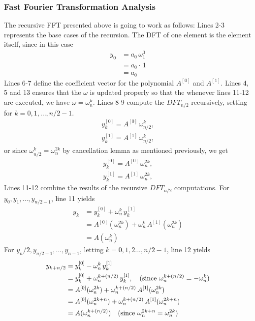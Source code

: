 \documentclass[preprint,12pt]{elsarticle}
\begin{document}
\subsubsection{Fast Fourier Transformation Analysis}
The recursive FFT presented above is going to work as follows: Lines 2-3 represents the base cases of the recursion. The DFT of one element is the element itself, since in this case
\begin{align*}
    y_0 &= a_0\,\omega_1^0 \\
    &= a_0\cdot\,1 \\
    &= a_0
\end{align*}
Lines 6-7 define the coefficient vector for the polynomial $A^{[0]}$ and $A^{[1]}$. Lines 4, 5 and 13 ensures that the $\omega$ is updated properly so that the whenever lines 11-12 are executed, we have $\omega = \omega^k_n$. Lines 8-9 compute the $DFT_{n/2}$ recursively, setting for $k=0,1,...,n/2-1$. 
\begin{align*}
    y^{[0]}_k = A^{[0]}\,\omega^k_{n/2}, \\
    y^{[1]}_k = A^{[1]}\,\omega^k_{n/2},
\end{align*}
or since $\omega_{n/2}^k = \omega^{2k}_n$ by cancellation lemma as mentioned previously, we get
\begin{align*}
    y^{[0]}_k = A^{[0]}\,\omega^{2k}_{n}, \\
    y^{[1]}_k = A^{[1]}\,\omega^{2k}_{n},
\end{align*}
Lines 11-12 combine the results of the recursive $DFT_{n/2}$ computations. For $y_0,y_1,...,y_{n/2-1}$, line 11 yields
\begin{align*}
    y_k &= y_k^{[0]} + \omega^k_n\,y^{[1]}_k \\
    &= A^{[0]}(\omega^{2k}_n) + \omega^{k}_n\,A^{[1]}(\omega^{2k}_n) \\
    &= A(\omega^k_n)
\end{align*}
For $y_n/2, y_{n/2+1}, ..., y_{n-1}$, letting $k=0,1,2...,n/2-1$, line 12 yields
\begin{align*}
    y_{k+n/2} &= y^{[0]}_k - \omega^k_n\,y^{[1]}_k \\
    &= y^{[0]}_k + \omega^{k+(n/2)}_{n}\,y^{[1]}_k , \text{\,\,\,\, (since $\omega^{k+(n/2)}_n = -\omega^k_n$)} \\
    &= A^{[0]}(\omega^{2k}_n) + \omega^{k+(n/2)}_n\,A^{[1]}(\omega^{2k}_n) \\
    &= A^{[0]}(\omega^{2k+n}_n) + \omega^{k+(n/2)}_n\,A^{[1]}(\omega^{2k+n}_n) \\
    &= A(\omega^{k+(n/2)}_n)  \text{\,\,\,\, (since $\omega^{2k+n}_n = \omega^{2k}_n$)} 
\end{align*}
\end{document}
